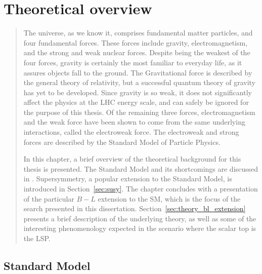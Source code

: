 \chapter[Theoretical overview][Theory]{Theoretical overview}
\label{ch:theory}

\begin{quote}
The universe, as we know it, comprises fundamental matter particles, and
four fundamental forces.
These forces include gravity, electromagnetism, and the strong and weak nuclear
forces.
Despite being the weakest of the four forces, gravity is certainly the most
familiar to everyday life, as it assures objects fall to the ground.
The Gravitational force is described by the general theory of relativity,
but a successful quantum theory of gravity has yet to be developed.
Since gravity is so weak, it does not significantly affect the physics at the
LHC energy scale, and can safely be ignored for the purpose of this thesis.
Of the remaining three forces,  electromagnetism and the weak force have been
shown to come from the same underlying interactions, called the electroweak
force.
The electroweak and strong forces are described by the Standard Model of
Particle Physics.

In this chapter, a brief overview of the theoretical background for this thesis
is presented.
The Standard Model and its shortcomings are discussed
in .
Supersymmetry, a popular extension to the Standard Model, is introduced in
Section~\ref{sec:susy}.
The chapter concludes with a presentation of the particular $B-L$ extension to
the SM, which is the focus of the search presented in this dissertation.
Section~\ref{sec:theory_bl_extension} presents a brief description of
the underlying theory, as well as some of the interesting phenomenology expected
in the scenario where the scalar top is the LSP.
\end{quote}

\FloatBarrier
\section{Standard Model}
\label{sec:sm}

